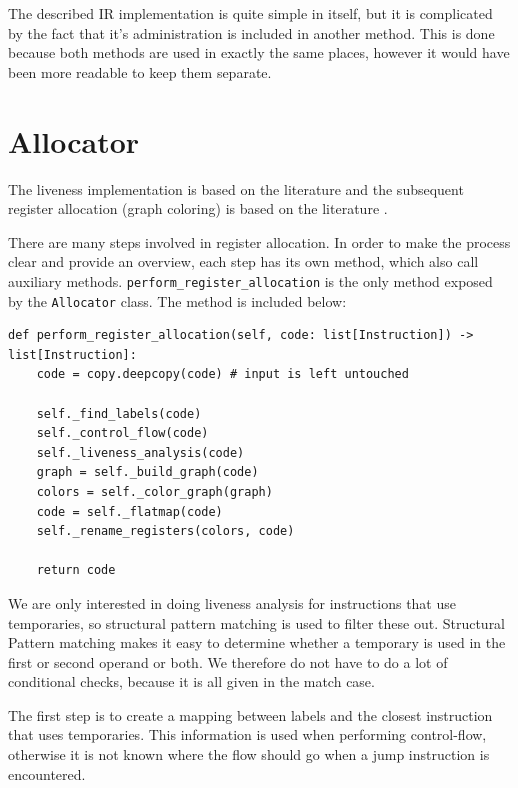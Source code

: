 The described IR implementation is quite simple in itself, but it is complicated by the fact that it's administration is included in another method. This is done because both methods are used in exactly the same places, however it would have been more readable to keep them separate.

\section{Allocator}
The liveness implementation is based on the literature \cite[218-223]{ModernCompilerImplementation} and the subsequent register allocation (graph coloring) is based on the literature \cite[235-238]{ModernCompilerImplementation}. 

There are many steps involved in register allocation. In order to make the process clear and provide an overview, each step has its own method, which also call auxiliary methods. \texttt{perform\_register\_allocation} is the only method exposed by the \texttt{Allocator} class. The method is included below:

\begin{verbatim}
def perform_register_allocation(self, code: list[Instruction]) -> list[Instruction]:
    code = copy.deepcopy(code) # input is left untouched

    self._find_labels(code)
    self._control_flow(code)
    self._liveness_analysis(code)
    graph = self._build_graph(code)
    colors = self._color_graph(graph)
    code = self._flatmap(code)
    self._rename_registers(colors, code)

    return code
\end{verbatim}

We are only interested in doing liveness analysis for instructions that use temporaries, so structural pattern matching is used to filter these out. Structural Pattern matching makes it easy to determine whether a temporary is used in the first or second operand or both. We therefore do not have to do a lot of conditional checks, because it is all given in the match case. 

The first step is to create a mapping between labels and the closest instruction that uses temporaries. This information is used when performing control-flow, otherwise it is not known where the flow should go when a jump instruction is encountered.


